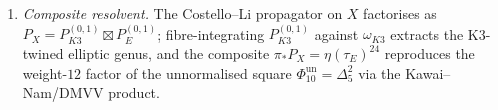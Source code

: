 \begin{proposition}
\begin{enumerate}[label=\textup{(\roman*)}]
 \[
 \pi_* \Obs_{\hCS}^{\fg_{\Delta_5}^{\mathrm{re}}}(X) \;\simeq\; V^{\mathrm{ch}}(\fg_{\Delta_5}^{\mathrm{re}}),
 \]
 where the right-hand side is the real-root subenvelope of the
Gritsenko--Nikulin BKM superalgebra. Its Weyl factor is
 \[
 e^{-\rho_W}\prod_{\alpha\in\Delta^{\mathrm{re}}_+}
 \bigl(1-e^{-\alpha}\bigr)^{-1},
 \]
and its Borcherds-weight normalisation is fixed by the $N=1$ identity
$\kBKM(\Delta_5)=c_1(0)/2=5$. The full imaginary-root multiplicity
extension is Theorem~\ref{thm:hcs-pushforward-imaginary-roots-singular-theta}.
 \item \emph{Composite resolvent.} The Costello--Li propagator on $X$ factorises as $P_X = P_{K3}^{(0,1)} \boxtimes P_E^{(0,1)}$; fibre-integrating $P_{K3}^{(0,1)}$ against $\omega_{K3}$ extracts the K3-twined elliptic genus, and the composite $\pi_* P_X = \eta(\tau_E)^{24}$ reproduces the weight-$12$ factor of the unnormalised square $\Phi_{10}^{\mathrm{un}} = \Delta_5^2$ via the Kawai--Nam/DMVV product.
\end{enumerate}
\end{proposition}

